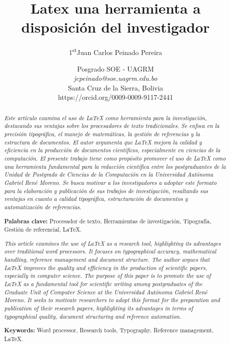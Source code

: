 \documentclass[12pt,twocolumn]{article}
\title{\Huge Latex una herramienta a disposición del investigador\\}
\author{\Large {1\textsuperscript{st}Juan Carlos Peinado Pereira}}
\date{\normalsize Posgrado SOE - UAGRM\\
\textit{jcpeinado@soe.uagrm.edu.bo}\\
Santa Cruz de la Sierra, Bolivia \\
https://orcid.org/0009-0009-9117-2441}
\begin{document}
\maketitle
\titlespacing*{\section}{0pt}{0cm}{0cm}
\titlespacing*{\subsection}{0pt}{0cm}{0cm}

\begin{abstract}
    \textit{\normalsize Este artículo examina el uso de LaTeX como herramienta para la investigación, destacando sus ventajas sobre los procesadores de texto tradicionales. 
    Se enfoca en la precisión tipográfica, el manejo de matemáticas, la gestión de referencias y la estructura de documentos. 
    El autor argumenta que LaTeX mejora la calidad y eficiencia en la producción de documentos científicos, especialmente en ciencias de la computación. 
    El presente trabajo tiene como propósito promover el uso de LaTeX como una herramienta fundamental para la redacción científica entre los postgraduantes de la Unidad de Postgrado de Ciencias de la Computación en la Universidad Autónoma Gabriel René Moreno. 
    Se busca motivar a los investigadores a adoptar este formato para la elaboración y publicación de sus trabajos de investigación, resaltando sus ventajas en cuanto a calidad tipográfica, estructuración de documentos y automatización de referencias.} 
    \vspace{0.5cm}

    \textbf{Palabras clave:} Procesador de texto, Herramientas de investigación, Tipografía, Gestión de referencial, LaTeX.
\end{abstract}


\begin{abstract}
    \textit{\normalsize This article examines the use of LaTeX as a research tool, highlighting its advantages over traditional word processors. 
    It focuses on typographical accuracy, mathematical handling, reference management and document structure. 
    The author argues that LaTeX improves the quality and efficiency in the production of scientific papers, especially in computer science. 
    The purpose of this paper is to promote the use of LaTeX as a fundamental tool for scientific writing among postgraduates of the Graduate Unit of Computer Science at the Universidad Autónoma Gabriel René Moreno. 
    It seeks to motivate researchers to adopt this format for the preparation and publication of their research papers, highlighting its advantages in terms of typographical quality, document structuring and reference automation. }    
    \vspace{0.5cm}

    \textbf{Keywords:} Word processor, Research tools, Typography, Reference management, LaTeX.
\end{abstract}
\end{document}
